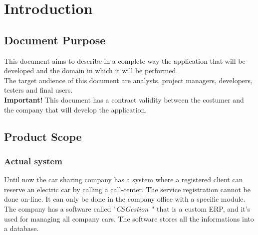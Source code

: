 \documentclass{article}
\newcommand{\csg}{\mbox{\normalfont\itshape CSGestion }}
\begin{document}
	\newpage
	
	
	\section{Introduction}
	
		\subsection{Document Purpose}
		This document aims to describe in a complete way the application that will be developed and the domain in which it will be performed.\\
		The target audience of this document are analysts, project managers, developers, testers and final users.\\
		\textbf{Important!} This document has a contract validity between the costumer and the company that will develop the application.
		
		\subsection{Product Scope}
		\subsubsection{Actual system}
		Until now the car sharing company has a system where a registered client can reserve an electric car by calling a call-center. The service registration cannot be done on-line. It can only be done in the company office with a specific module. The company has a software called "\csg" that is a custom ERP, and it's used for managing all company cars. The software stores all the informations into a database.
		
\end{document}
